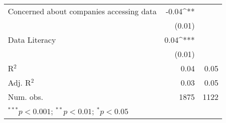 \begin{table}[t!h]
\begin{center}
\begin{tabular}{l D{.}{.}{4.5} D{.}{.}{4.5}}
Concerned about companies accessing data & -0.04^{**} &            \\
                                         & (0.01)     &            \\
Data Literacy                            & 0.04^{***} &            \\
                                         & (0.01)     &            \\
\midrule
R$^2$                                    & 0.04       & 0.05       \\
Adj. R$^2$                               & 0.03       & 0.05       \\
Num. obs.                                & 1875       & 1122       \\
\bottomrule
{}
\end{tabular}
\label{tab:selectionintotrackingsurvey}
\end{center}
\end{table}
